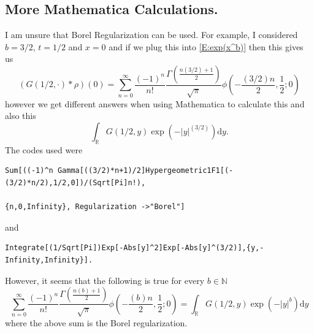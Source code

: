 \documentclass{article}
\numberwithin{equation}{section}
\newcommand{\R}{\mathbb{R}}
\newcommand{\ud}{\ensuremath{\mathrm{d}}}
\begin{document}
\subsection{More Mathematica Calculations.}\label{S:MMC}
I am unsure that Borel Regularization can be used. For example, I considered $b=3/2$, $t=1/2$ and $x=0$ and if we plug this into \eqref{E:exp(x^b)} then this gives us
\[
(G(1/2,\cdot) * \rho)(0) = \sum_{n=0}^\infty \frac{(-1)^n}{n!} \frac{\Gamma\left(\frac{n(3/2)+1}{2}\right)}{\sqrt{\pi}} \phi\left( -\frac{(3/2)n}{2}, \frac{1}{2} ; 0 \right)
\]
however we get different answers when using Mathematica to calculate this and also this
\[
\int_{\R} G(1/2,y)\exp\left(-|y|^{(3/2)}\right) \ud y.
\]
The codes used were
\begin{verbatim}
Sum[((-1)^n Gamma[((3/2)*n+1)/2]Hypergeometric1F1[(-(3/2)*n/2),1/2,0])/(Sqrt[Pi]n!),

{n,0,Infinity}, Regularization ->"Borel"]
\end{verbatim}
and
\begin{verbatim}
Integrate[(1/Sqrt[Pi])Exp[-Abs[y]^2]Exp[-Abs[y]^(3/2)],{y,-Infinity,Infinity}].
\end{verbatim}
However, it seems that the following is true for every $b \in \mathbb{N}$
\begin{equation}\label{E:BRsumrep}
\sum_{n=0}^\infty \frac{(-1)^n}{n!} \frac{\Gamma\left(\frac{n(b)+1}{2}\right)}{\sqrt{\pi}} \phi\left( -\frac{(b)n}{2}, \frac{1}{2} ; 0 \right) = 	\int_{\R} G(1/2,y)\exp(-|y|^b) \ud y
\end{equation}
where the above sum is the Borel regularization.
\end{document}
